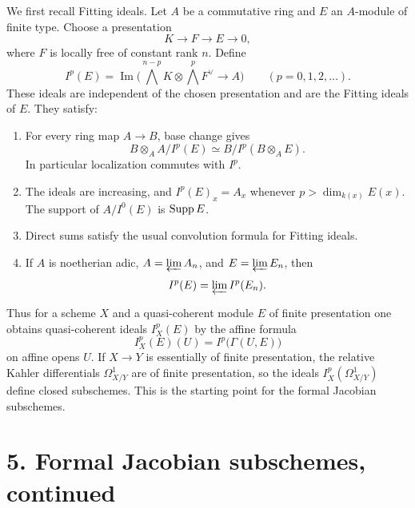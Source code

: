 \documentclass[11pt]{article}
\begin{document}
We first recall Fitting ideals. Let \(A\) be a commutative ring and \(E\) an \(A\)-module of finite type. Choose a presentation
\[
 K\to F\to E\to 0,
\]
where \(F\) is locally free of constant rank \(n\). Define
\[
 I^p(E)=\operatorname{Im}\bigl(\bigwedge^{n-p}K\otimes\bigwedge^{p}F^\vee\to A\bigr)
 \qquad (p=0,1,2,\ldots).
\]
These ideals are independent of the chosen presentation and are the Fitting ideals of \(E\). They satisfy:
\begin{enumerate}[label=(\alph*)]
\item For every ring map \(A\to B\), base change gives
\[
 B\otimes_A A/I^p(E)\simeq B/I^p(B\otimes_AE).
\]
In particular localization commutes with \(I^p\).
\item The ideals are increasing, and \(I^p(E)_x=A_x\) whenever \(p>\dim_{k(x)} E(x)\). The support of \(A/I^0(E)\) is \(\Supp E\).
\item Direct sums satisfy the usual convolution formula for Fitting ideals.
\item If \(A\) is noetherian adic, \(A=\varprojlim A_n\), and \(E=\varprojlim E_n\), then
\[
 I^p(E)=\varprojlim I^p(E_n).
\]
\end{enumerate}
Thus for a scheme \(X\) and a quasi-coherent module \(E\) of finite presentation one obtains quasi-coherent ideals \(I^p_X(E)\) by the affine formula
\[
 I^p_X(E)(U)=I^p\bigl(\Gamma(U,E)\bigr)
\]
on affine opens \(U\). If \(X\to Y\) is essentially of finite presentation, the relative Kahler differentials \(\Omega^1_{X/Y}\) are of finite presentation, so the ideals \(I^p_X(\Omega^1_{X/Y})\) define closed subschemes. This is the starting point for the formal Jacobian subschemes.



\providecommand{\Der}{\operatorname{Der}}
\providecommand{\Supp}{\operatorname{Supp}}
\providecommand{\Ann}{\operatorname{Ann}}
\providecommand{\Fitt}{\operatorname{Fitt}}
\providecommand{\Jac}{\operatorname{Jac}}
\providecommand{\Frac}{\operatorname{Frac}}
\providecommand{\Sym}{\operatorname{Sym}}
\providecommand{\codim}{\operatorname{codim}}
\providecommand{\cJ}{\mathcal J}
\providecommand{\cI}{\mathcal I}
\providecommand{\cK}{\mathcal K}
\providecommand{\cM}{\mathcal M}
\providecommand{\cN}{\mathcal N}
\providecommand{\cX}{\mathfrak X}
\providecommand{\cY}{\mathfrak Y}
\providecommand{\cS}{\mathfrak S}
\providecommand{\cZ}{\mathfrak Z}
\providecommand{\Oo}{\mathcal O}
\providecommand{\widebar}{\overline}


\section*{5. Formal Jacobian subschemes, continued}
\end{document}
